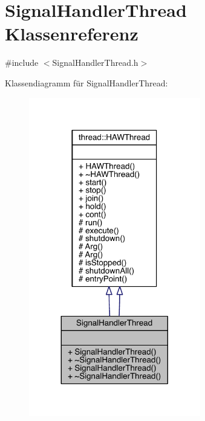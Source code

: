 \hypertarget{class_signal_handler_thread}{}\section{Signal\+Handler\+Thread Klassenreferenz}
\label{class_signal_handler_thread}


{\ttfamily \#include $<$Signal\+Handler\+Thread.\+h$>$}



Klassendiagramm für Signal\+Handler\+Thread\+:\nopagebreak
\begin{figure}[H]
\begin{center}
\leavevmode
\includegraphics[width=212pt]{class_signal_handler_thread__inherit__graph}
\end{center}
\end{figure}


